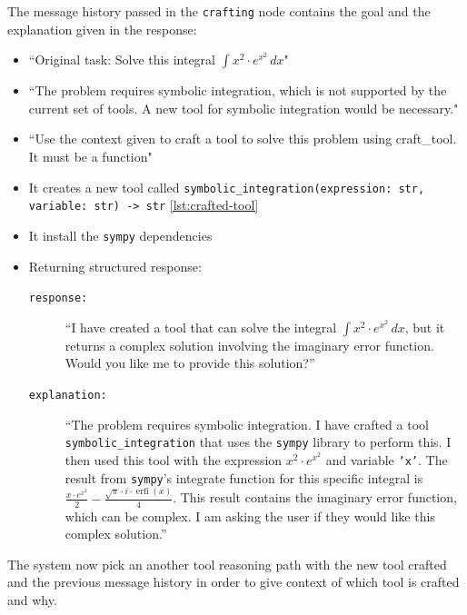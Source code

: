 \documentclass[12pt,a4paper,openright,twoside]{book}
\begin{document}
The message history passed in the \texttt{crafting} node contains the goal and the explanation given in the response:
\begin{itemize}
    \item[\textbf{Node Prompt:}] ``Original task: Solve this integral $\int x^2 \cdot e^{x^2} \, dx$"
    \item[\textbf{AI:}] ``The problem requires symbolic integration, which is not supported by the current set of tools. A new tool for symbolic integration would be necessary."
    \item[\textbf{System:}] ``Use the context given to craft a tool to solve this problem using craft\_tool. It must be a function"
    \item[\textbf{AI:}] It creates a new tool called \texttt{symbolic\_integration(expression: str, variable: str) -> str} \cref{lst:crafted-tool}
    \item[\textbf{AI:}] It install the \texttt{sympy} dependencies
    \item[\textbf{AI:}] Returning structured response: 
    \begin{description}
        \item[\texttt{response:}] ``I have created a tool that can solve the integral $\int x^2 \cdot e^{x^2} \, dx$, but it returns a complex solution involving the imaginary error function. Would you like me to provide this solution?'' 
        \item[\texttt{explanation:}] ``The problem requires symbolic integration. I have crafted a tool \texttt{symbolic\_integration} that uses the \texttt{sympy} library to perform this. I then used this tool with the expression $x^2 \cdot e^{x^2}$ and variable \texttt{'x'}. The result from \texttt{sympy}'s integrate function for this specific integral is $\frac{x \cdot e^{x^2}}{2} - \frac{\sqrt{\pi} \cdot i \cdot \operatorname{erfi}(x)}{4}$. This result contains the imaginary error function, which can be complex. I am asking the user if they would like this complex solution.''
    \end{description}
\end{itemize}

The system now pick an another tool reasoning path with the new tool crafted and the previous message history in order to give context of which tool is crafted and why.
\end{document}
